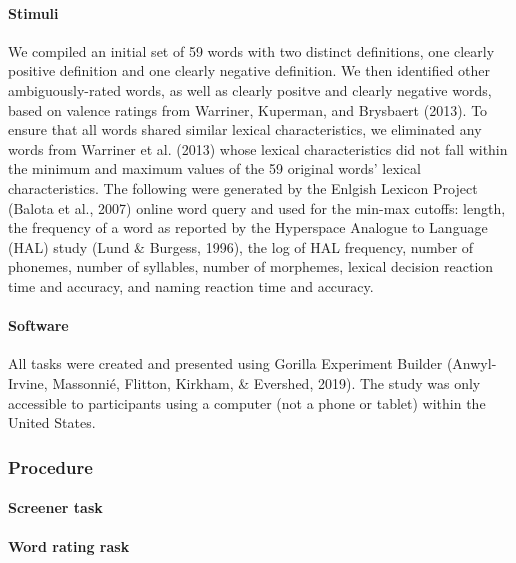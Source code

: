 \documentclass[man]{apa6}
\let\oldparagraph\paragraph
\renewcommand{\paragraph}[1]{\oldparagraph{#1}\mbox{}}
\begin{document}
\hypertarget{stimuli}{%
\paragraph{Stimuli}\label{stimuli}}

We compiled an initial set of 59 words with two distinct definitions, one clearly positive definition and one clearly negative definition. We then identified other ambiguously-rated words, as well as clearly positve and clearly negative words, based on valence ratings from Warriner, Kuperman, and Brysbaert (2013). To ensure that all words shared similar lexical characteristics, we eliminated any words from Warriner et al. (2013) whose lexical characteristics did not fall within the minimum and maximum values of the 59 original words' lexical characteristics. The following were generated by the Enlgish Lexicon Project (Balota et al., 2007) online word query and used for the min-max cutoffs: length, the frequency of a word as reported by the Hyperspace Analogue to Language (HAL) study (Lund \& Burgess, 1996), the log of HAL frequency, number of phonemes, number of syllables, number of morphemes, lexical decision reaction time and accuracy, and naming reaction time and accuracy.

\hypertarget{software}{%
\paragraph{Software}\label{software}}

All tasks were created and presented using Gorilla Experiment Builder (Anwyl-Irvine, Massonnié, Flitton, Kirkham, \& Evershed, 2019). The study was only accessible to participants using a computer (not a phone or tablet) within the United States.

\hypertarget{procedure}{%
\subsubsection{Procedure}\label{procedure}}

\hypertarget{screener-task}{%
\paragraph{Screener task}\label{screener-task}}

\hypertarget{word-rating-rask}{%
\paragraph{Word rating rask}\label{word-rating-rask}}
\end{document}
